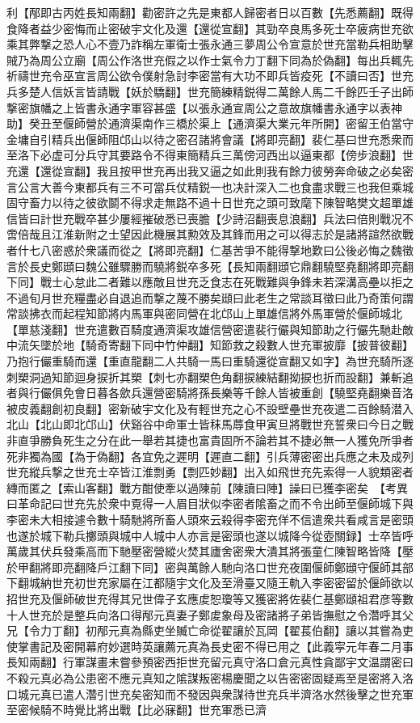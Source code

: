 利【邴即古丙姓長知兩翻】勸密許之先是東都人歸密者日以百數【先悉薦翻】既得食降者益少密悔而止密破宇文化及還【還從宣翻】其勁卒良馬多死士卒疲病世充欲乘其弊撃之恐人心不壹乃詐稱左軍衛士張永通三夢周公令宣意於世充當勒兵相助擊賊乃為周公立廟【周公作洛世充假之以作士氣令力丁翻下同為於偽翻】每出兵輒先祈禱世充令巫宣言周公欲令僕射急討李密當有大功不即兵皆疫死【不讀曰否】世充兵多楚人信妖言皆請戰【妖於驕翻】世充簡練精鋭得二萬餘人馬二千餘匹壬子出師撃密旗幡之上皆書永通字軍容甚盛【以張永通宣周公之意故旗幡書永通字以表神助】癸丑至偃師營於通濟渠南作三橋於渠上【通濟渠大業元年所開】密留王伯當守金墉自引精兵出偃師阻邙山以待之密召諸將會議【將即亮翻】裴仁基曰世充悉衆而至洛下必虚可分兵守其要路令不得東簡精兵三萬傍河西出以逼東都【傍步浪翻】世充還【還從宣翻】我且按甲世充再出我又逼之如此則我有餘力彼勞奔命破之必矣密言公言大善今東都兵有三不可當兵仗精鋭一也决計深入二也食盡求戰三也我但乘城固守畜力以待之彼欲鬬不得求走無路不過十日世充之頭可致麾下陳智略樊文超單雄信皆曰計世充戰卒甚少屢經摧破悉已喪膽【少詩沼翻喪息浪翻】兵法曰倍則戰况不啻倍哉且江淮新附之士望因此機展其勲效及其鋒而用之可以得志於是諸將諠然欲戰者什七八密惑於衆議而從之【將即亮翻】仁基苦爭不能得撃地歎曰公後必悔之魏徵言於長史鄭頲曰魏公雖驟勝而驍將鋭卒多死【長知兩翻頲它鼎翻驍堅堯翻將即亮翻下同】戰士心怠此二者難以應敵且世充乏食志在死戰難與争鋒未若深溝高壘以拒之不過旬月世充糧盡必自退追而撃之蔑不勝矣頲曰此老生之常談耳徵曰此乃奇策何謂常談拂衣而起程知節將内馬軍與密同營在北邙山上單雄信將外馬軍營於偃師城北【單慈淺翻】世充遣數百騎度通濟渠攻雄信營密遣裴行儼與知節助之行儼先馳赴敵中流矢墜於地【騎奇寄翻下同中竹仲翻】知節救之殺數人世充軍披靡【披普彼翻】乃抱行儼重騎而還【重直龍翻二人共騎一馬曰重騎還從宣翻又如字】為世充騎所逐刺槊洞過知節迴身捩折其槊【刺七亦翻槊色角翻捩練結翻拗捩也折而設翻】兼斬追者與行儼俱免會日暮各歛兵還營密騎將孫長樂等千餘人皆被重創【驍堅堯翻樂音洛被皮義翻創初良翻】密新破宇文化及有輕世充之心不設壁壘世充夜遣二百餘騎潜入北山【北山即北邙山】伏谿谷中命軍士皆秣馬蓐食甲寅旦將戰世充誓衆曰今日之戰非直爭勝負死生之分在此一舉若其捷也富貴固所不論若其不捷必無一人獲免所爭者死非獨為國【為于偽翻】各宜免之遲明【遲直二翻】引兵薄密密出兵應之未及成列世充縱兵撃之世充士卒皆江淮剽勇【剽匹妙翻】出入如飛世充先索得一人貌類密者縳而匿之【索山客翻】戰方酣使牽以過陳前【陳讀曰陣】譟曰已獲李密矣　【考異曰革命記曰世充先於衆中覔得一人眉目狀似李密者隂畜之而不令出師至偃師城下與李密未大相接遽令數十騎馳將所畜人頭來云殺得李密充佯不信遣衆共看咸言是密頭也遂於城下勒兵擲頭與城中人城中人亦言是密頭也遂以城降今從壺關録】士卒皆呼萬歲其伏兵發乘高而下馳壓密營縱火焚其廬舍密衆大潰其將張童仁陳智略皆降【壓於甲翻將即亮翻降戶江翻下同】密與萬餘人馳向洛口世充夜圍偃師鄭頲守偃師其部下翻城納世充初世充家屬在江都隨宇文化及至滑臺又隨王軌入李密密留於偃師欲以招世充及偃師破世充得其兄世偉子玄應䖍恕瓊等又獲密將佐裴仁基鄭頲祖君彦等數十人世充於是整兵向洛口得邴元真妻子鄭䖍象母及密諸將子弟皆撫慰之令濳呼其父兄【令力丁翻】初邴元真為縣吏坐贓亡命從翟讓於瓦岡【翟萇伯翻】讓以其嘗為吏使掌書記及密開幕府妙選時英讓薦元真為長史密不得已用之【此義寜元年春二月事長知兩翻】行軍謀畫未嘗參預密西拒世充留元真守洛口倉元真性貪鄙宇文温謂密曰不殺元真必為公患密不應元真知之隂謀叛密楊慶聞之以告密密固疑焉至是密將入洛口城元真已遣人濳引世充矣密知而不發因與衆謀待世充兵半濟洛水然後擊之世充軍至密候騎不時覺比將出戰【比必寐翻】世充軍悉已濟